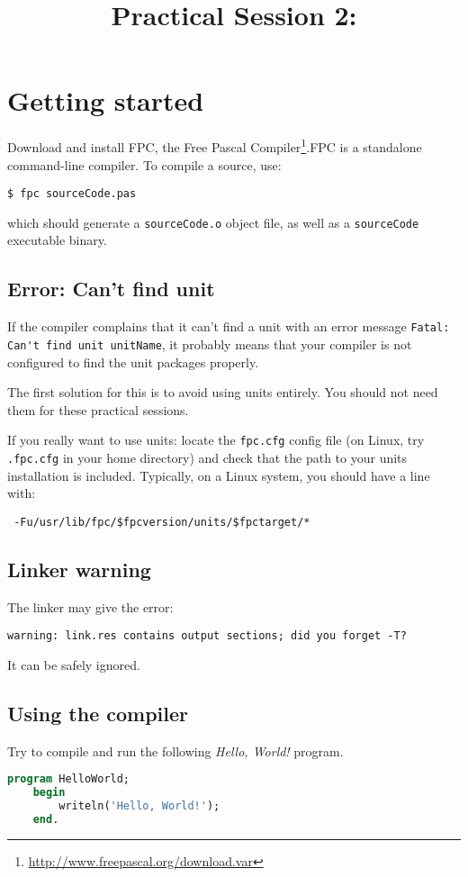 \documentclass{../../tp}
\title{Practical Session 2: \pascal}
\author{}
\begin{document}
\maketitle


\section{Getting started}

Download and install \textsf{FPC}, the \textsf{Free Pascal Compiler}\footnote{ \url{http://www.freepascal.org/download.var}}.\textsf{FPC} is a \pascal standalone command-line compiler. To compile a \pascal source, use: 

\verb|$ fpc sourceCode.pas|

which should generate a \verb|sourceCode.o| object file, as well as a \verb|sourceCode| executable binary.

\subsection{Error: Can't find unit}

If the compiler complains that it can't find a unit with an error message \verb|Fatal: Can't find unit unitName|, it probably means that your compiler is not configured to find the unit packages properly.

The first solution for this is to avoid using units entirely. You should not need them for these practical sessions.

If you really want to use units: locate the \verb|fpc.cfg| config file (on Linux, try \verb|.fpc.cfg| in your home directory) and check that the path to your units installation is included. Typically, on a Linux system, you should have a line with:

\verb| -Fu/usr/lib/fpc/$fpcversion/units/$fpctarget/*|

\subsection{Linker warning}

The linker may give the error:

\verb|warning: link.res contains output sections; did you forget -T?|

It can be safely ignored. 

\subsection{Using the compiler}
\begin{instruction}
	Try to compile and run the following \emph{Hello, World!} program.
	
	\begin{lstlisting}[language=Pascal]
	program HelloWorld;
	begin 
		writeln('Hello, World!');
	end.
	\end{lstlisting}
\end{instruction}
\end{document}
